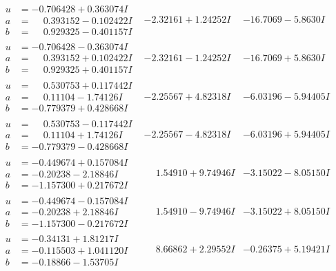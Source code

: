 \documentclass[1p]{elsarticle_modified}
\theoremstyle{definition}
\begin{document}
$$\begin{array}{c|c|c}
\begin{aligned}
u &= -0.706428 + 0.363074 I \\
a &= \phantom{-}0.393152 - 0.102422 I \\
b &= \phantom{-}0.929325 - 0.401157 I\end{aligned}
 & -2.32161 + 1.24252 I & -16.7069 - 5.8630 I \\ \hline\begin{aligned}
u &= -0.706428 - 0.363074 I \\
a &= \phantom{-}0.393152 + 0.102422 I \\
b &= \phantom{-}0.929325 + 0.401157 I\end{aligned}
 & -2.32161 - 1.24252 I & -16.7069 + 5.8630 I \\ \hline\begin{aligned}
u &= \phantom{-}0.530753 + 0.117442 I \\
a &= \phantom{-}0.11104 - 1.74126 I \\
b &= -0.779379 + 0.428668 I\end{aligned}
 & -2.25567 + 4.82318 I & -6.03196 - 5.94405 I \\ \hline\begin{aligned}
u &= \phantom{-}0.530753 - 0.117442 I \\
a &= \phantom{-}0.11104 + 1.74126 I \\
b &= -0.779379 - 0.428668 I\end{aligned}
 & -2.25567 - 4.82318 I & -6.03196 + 5.94405 I \\ \hline\begin{aligned}
u &= -0.449674 + 0.157084 I \\
a &= -0.20238 - 2.18846 I \\
b &= -1.157300 + 0.217672 I\end{aligned}
 & \phantom{-}1.54910 + 9.74946 I & -3.15022 - 8.05150 I \\ \hline\begin{aligned}
u &= -0.449674 - 0.157084 I \\
a &= -0.20238 + 2.18846 I \\
b &= -1.157300 - 0.217672 I\end{aligned}
 & \phantom{-}1.54910 - 9.74946 I & -3.15022 + 8.05150 I \\ \hline\begin{aligned}
u &= -0.34131 + 1.81217 I \\
a &= -0.115503 + 1.041120 I \\
b &= -0.18866 - 1.53705 I\end{aligned}
 & \phantom{-}8.66862 + 2.29552 I & -0.26375 + 5.19421 I \\ \hline\begin{aligned}

\end{aligned}
\end{array}$$
\end{document}
